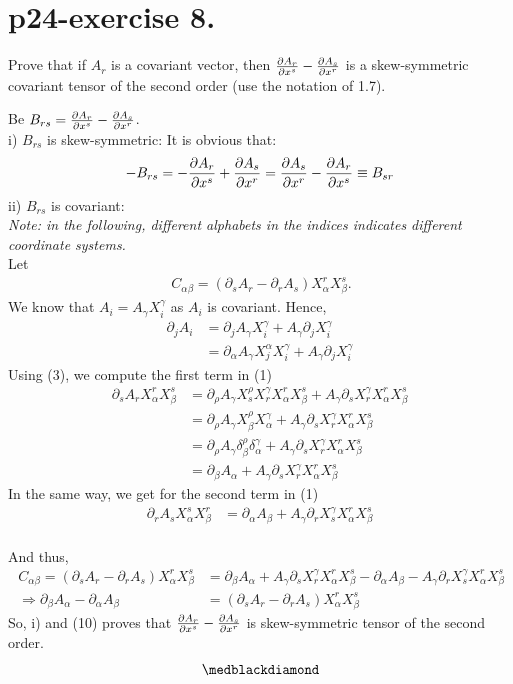 \section{p24-exercise 8.}
\begin{tcolorbox}
Prove that if $A_{r}$ is a covariant vector, then $\pdv{A_{r}}{x^{s}} - \pdv{A_{s}}{x^{r}}$ is a skew-symmetric covariant tensor of the second order (use the notation of 1.7).
\end{tcolorbox}
Be $B_{rs} = \pdv{A_{r}}{x^{s}} - \pdv{A_{s}}{x^{r}}$.\\
i) $B_{rs}$ is skew-symmetric:
It is obvious that:$$-B_{rs} = -\pdv{A_{r}}{x^{s}} + \pdv{A_{s}}{x^{r}} = \pdv{A_{s}}{x^{r}}-\pdv{A_{r}}{x^{s}}\equiv B_{sr}$$
ii)  $B_{rs}$ is covariant:\\
\textit{Note: in the following, different alphabets in the indices indicates different coordinate systems.}\\
Let 
\begin{align}
\ C_{\alpha\beta} = (\partial_sA_r - \partial_rA_s)X^r_{\alpha}X^s_{\beta}. 
\end{align}
We know that $A_i= A_{\gamma}X^{\gamma}_i$  as $A_i$ is covariant. Hence,
\begin{align}
\partial_jA_i &= \partial_j A_{\gamma} X^{\gamma}_i + A_{\gamma}\partial_jX^{\gamma}_i\\
\ &= \partial_{\alpha} A_{\gamma} X^{\alpha}_j X^{\gamma}_i + A_{\gamma}\partial_jX^{\gamma}_i
\end{align}
Using (3), we compute the first term in (1)
\begin{align}
\partial_sA_rX^r_{\alpha}X^s_{\beta}&=  \partial_{\rho} A_{\gamma} X^{\rho}_s X^{\gamma}_rX^r_{\alpha}X^s_{\beta}+A_{\gamma}\partial_sX^{\gamma}_rX^r_{\alpha}X^s_{\beta}\\
\ &=  \partial_{\rho} A_{\gamma} X^{\rho}_{\beta} X^{\gamma}_{\alpha}+A_{\gamma}\partial_sX^{\gamma}_rX^r_{\alpha}X^s_{\beta}\\
\ &=  \partial_{\rho} A_{\gamma} \delta^{\rho}_{\beta} \delta^{\gamma}_{\alpha}+A_{\gamma}\partial_sX^{\gamma}_rX^r_{\alpha}X^s_{\beta}\\
\ &=  \partial_{\beta} A_{\alpha} +A_{\gamma}\partial_sX^{\gamma}_rX^r_{\alpha}X^s_{\beta}
\end{align}
In the same way, we get for the second term in (1)
\begin{align}
\partial_rA_sX^s_{\alpha}X^r_{\beta} &=  \partial_{\alpha} A_{\beta} + A_{\gamma}\partial_rX^{\gamma}_sX^r_{\alpha}X^s_{\beta}
\end{align}\\
And thus,
\begin{align}
\ C_{\alpha\beta} =(\partial_sA_r - \partial_rA_s)X^r_{\alpha}X^s_{\beta} &=\partial_{\beta} A_{\alpha} +A_{\gamma}\partial_sX^{\gamma}_rX^r_{\alpha}X^s_{\beta} - \partial_{\alpha} A_{\beta} - A_{\gamma}\partial_rX^{\gamma}_sX^r_{\alpha}X^s_{\beta}\\
\ \Rightarrow \partial_{\beta} A_{\alpha}  - \partial_{\alpha} A_{\beta} &=  (\partial_sA_r - \partial_rA_s)X^r_{\alpha}X^s_{\beta}
\end{align}
So, i) and (10) proves that $\pdv{A_{r}}{x^{s}} - \pdv{A_{s}}{x^{r}}$ is skew-symmetric tensor of the second order.
$$\medblackdiamond$$
\pagebreak[4]

